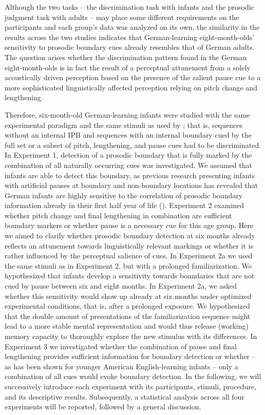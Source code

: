 \documentclass[output=paper]{langscibook}
\begin{document}
Although the two tasks -- the discrimination task with infants and the prosodic judgment task with adults -- may place some different requirements on the participants and each group’s data was analyzed on its own, the similarity in the results across the two studies indicates that German-learning eight-month-olds’ sensitivity to prosodic boundary cues already resembles that of German adults. The question arises whether the discrimination pattern found in the German eight-month-olds is in fact the result of a perceptual attunement from a solely acoustically driven perception based on the presence of the salient pause cue to a more sophisticated linguistically affected perception relying on pitch change and lengthening.

Therefore, six-month-old German-learning infants were studied with the same experimental paradigm and the same stimuli as used by \citet{Wellmann2012}; that is, sequences without an internal IPB and sequences with an internal boundary cued by the full set or a subset of pitch, lengthening, and pause cues had to be discriminated.
In Experiment 1, detection of a prosodic boundary that is fully marked by the combination of all naturally occurring cues was investigated. We assumed that infants are able to detect this boundary, as previous research presenting infants with artificial pauses at boundary and non-boundary locations has revealed that German infants are highly sensitive to the correlation of prosodic boundary information already in their first half year of life (\citealt{Schmitz2008}).
Experiment 2 examined whether pitch change and final lengthening in combination are sufficient boundary markers or whether pause is a necessary cue for this age group. Here we aimed to clarify whether prosodic boundary detection at six months already reflects an attunement towards linguistically relevant markings or whether it is rather influenced by the perceptual salience of cues.
In Experiment 2a we used the same stimuli as in Experiment 2, but with a prolonged familiarization. We hypothesized that infants develop a sensitivity towards boundaries that are not cued by pause between six and eight months. In Experiment 2a, we asked whether this sensitivity would show up already at six months under optimized experimental conditions, that is, after a prolonged exposure. We hypothesized that the double amount of presentations of the familiarization sequence might lead to a more stable mental representation and would thus release (working) memory capacity to thoroughly explore the new stimulus with its differences.
In Experiment 3 we investigated whether the combination of pause and final lengthening provides sufficient information for boundary detection or whether -- as has been shown for younger American English-learning infants -- only a combination of all cues would evoke boundary detection.
In the following, we will successively introduce each experiment with its participants, stimuli, procedure, and its descriptive results. Subsequently, a statistical analysis across all four experiments will be reported, followed by a general discussion.
\end{document}
